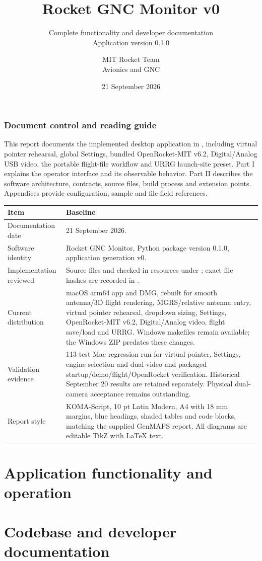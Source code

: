 \documentclass[english,10pt,a4paper,titlepage]{scrartcl}
\title{Rocket GNC Monitor v0}
\subtitle{Complete functionality and developer documentation\\Application version 0.1.0}
\author{MIT Rocket Team\\Avionics and GNC}
\date{21 September 2026}
\begin{document}
\maketitle
\section*{Document control and reading guide}
This report documents the implemented desktop application in
, including virtual pointer rehearsal, global Settings, bundled OpenRocket-MIT v6.2, Digital/Analog USB video, the portable flight-file workflow and
URRG launch-site preset. Part I explains the operator interface and its
observable behavior. Part II describes the software architecture, contracts,
source files, build process and extension points. Appendices provide configuration,
sample and file-field references.

\begin{longtable}{@{}L{.27\linewidth}L{.68\linewidth}@{}}
\toprule Item & Baseline \\\midrule\endhead
Documentation date & 21 September 2026. \\
Software identity & Rocket GNC Monitor, Python package version 0.1.0, application generation v0. \\
Implementation reviewed & Source files and checked-in resources under ; exact file hashes are recorded in . \\
Current distribution & macOS arm64 app and DMG, rebuilt for smooth antenna/3D flight rendering, MGRS/relative antenna entry, virtual pointer rehearsal, dropdown sizing, Settings, OpenRocket-MIT v6.2, Digital/Analog video, flight save/load and URRG. Windows makefiles remain available; the Windows ZIP predates these changes. \\
Validation evidence & 113-test Mac regression run for virtual pointer, Settings, engine selection and dual video and packaged startup/demo/flight/OpenRocket verification. Historical September 20 results are retained separately. Physical dual-camera acceptance remains outstanding. \\
Report style & KOMA-Script, 10 pt Latin Modern, A4 with 18 mm margins, blue headings, shaded tables and code blocks, matching the supplied GenMAPS report. All diagrams are editable TikZ with LaTeX text. \\
\bottomrule
\end{longtable}

\clearpage
{\small{}\tableofcontents}
\clearpage
\part{Application functionality and operation}

\clearpage
\part{Codebase and developer documentation}

\appendix

\label{LastContentPage}
\end{document}
